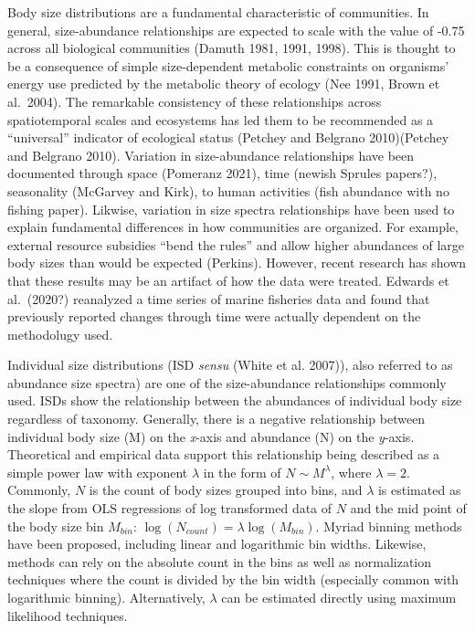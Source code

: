 \documentclass[
]{article}
\begin{document}
Body size distributions are a fundamental characteristic of communities.
In general, size-abundance relationships are expected to scale with the
value of -0.75 across all biological communities (Damuth 1981, 1991,
1998). This is thought to be a consequence of simple size-dependent
metabolic constraints on organisms' energy use predicted by the
metabolic theory of ecology (Nee 1991, Brown et al.~2004). The
remarkable consistency of these relationships across spatiotemporal
scales and ecosystems has led them to be recommended as a ``universal''
indicator of ecological status (Petchey and Belgrano 2010)(Petchey and
Belgrano 2010). Variation in size-abundance relationships have been
documented through space (Pomeranz 2021), time (newish Sprules papers?),
seasonality (McGarvey and Kirk), to human activities (fish abundance
with no fishing paper). Likwise, variation in size spectra relationships
have been used to explain fundamental differences in how communities are
organized. For example, external resource subsidies ``bend the rules''
and allow higher abundances of large body sizes than would be expected
(Perkins). However, recent research has shown that these results may be
an artifact of how the data were treated. Edwards et al.~(2020?)
reanalyzed a time series of marine fisheries data and found that
previously reported changes through time were actually dependent on the
methodolugy used.

Individual size distributions (ISD \emph{sensu} (White et al. 2007)),
also referred to as abundance size spectra) are one of the
size-abundance relationships commonly used. ISDs show the relationship
between the abundances of individual body size regardless of taxonomy.
Generally, there is a negative relationship between individual body size
(M) on the \emph{x}-axis and abundance (N) on the \emph{y}-axis.
Theoretical and empirical data support this relationship being described
as a simple power law with exponent \(\lambda\) in the form of
\(N \sim M^{\lambda}\), where \(\lambda = 2\). Commonly, \(N\) is the
count of body sizes grouped into bins, and \(\lambda\) is estimated as
the slope from OLS regressions of log transformed data of \(N\) and the
mid point of the body size bin \(M_{bin}\):
\(\log(N_{count}) = \lambda \log(M_{bin})\). Myriad binning methods have
been proposed, including linear and logarithmic bin widths. Likewise,
methods can rely on the absolute count in the bins as well as
normalization techniques where the count is divided by the bin width
(especially common with logarithmic binning). Alternatively, \(\lambda\)
can be estimated directly using maximum likelihood techniques.
\end{document}
